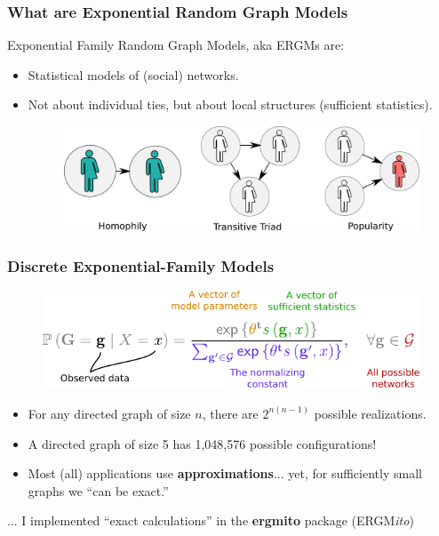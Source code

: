 \documentclass[aspectratio=169,9pt,handout]{beamer}
\begin{document}
\begin{frame}
\frametitle{What are Exponential Random Graph Models}

Exponential Family Random Graph Models, aka \alert{ERGMs} are:\pause

\begin{itemize}
\item Statistical models of (social) networks.\pause
\item Not about individual ties, but about local structures (sufficient statistics).\pause
\begin{figure}
\includegraphics[width=.6\linewidth]{friendly-terms.pdf}
\end{figure}
\end{itemize}

\end{frame}

\begin{frame}[t,label=discrete-exponential]
	
	\frametitle{Discrete Exponential-Family Models}
	
	\begin{figure}
		\includegraphics[width=.7\linewidth]{parts-of-ergm.pdf}
	\end{figure}\pause
	
	\vfill
		
	\begin{itemize}
		\item For any directed graph of size $n$, there are $2^{n(n - 1)}$ possible realizations.\pause
		\item A directed graph of size 5 has 1,048,576 possible configurations!\pause
		\item Most (all) applications use \textbf{approximations}...\pause{} yet, for sufficiently small graphs we ``can be exact.''
	\end{itemize}\pause

	\Large ... I implemented ``exact calculations'' in the \textbf{ergmito} package (ERGM\textit{ito})\normalsize
	
	\vfill\hfill\hyperlink{discrete-exponential-theory}{} %
	\hyperlink{ergm-terms}{}

	
\end{frame}
\end{document}
